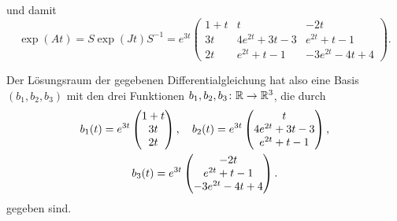 \documentclass[a4paper, 10pt]{scrartcl}
\begin{document}
und damit
\[
    \exp(At)
  = S \exp(Jt) S^{-1}
  =
  e^{3t}
  \begin{pmatrix}
    1 + t &              t      &           - 2 t     \\
       3t & 4 e^{2t} + 3 t - 3  &    e^{2t} +   t - 1 \\
       2t &   e^{2t} +   t - 1  & -3 e^{2t} - 4 t + 4
  \end{pmatrix}.
\]

Der Lösungsraum der gegebenen Differentialgleichung hat also eine Basis $(b_1, b_2, b_3)$ mit den drei Funktionen $b_1, b_2, b_3 \colon \mathbb{R} \to \mathbb{R}^3$, die durch
\begin{gather*}
  b_1(t) = e^{3t} \begin{pmatrix} 1+t \\ 3t \\ 2t \end{pmatrix},
  \quad
  b_2(t) = e^{3t} \begin{pmatrix} t \\ 4 e^{2t} + 3 t - 3 \\ e^{2t} + t - 1 \end{pmatrix},     \\
  b_3(t) = e^{3t} \begin{pmatrix} -2t \\ e^{2t} + t - 1 \\ -3 e^{2t} - 4 t + 4 \end{pmatrix}.
\end{gather*}
gegeben sind.
\end{document}
